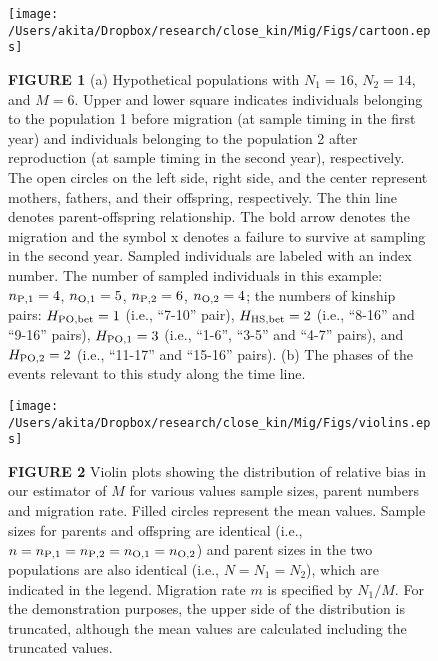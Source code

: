 \documentclass[12pt, English]{article}
\begin{document}
\begin{spacing}{1.9}
\clearpage


\newcommand{\figcapa}{(a) Hypothetical populations with $N_{1}=16$, $N_{2}=14$, and $M=6$. Upper and lower square indicates individuals belonging to the population 1 before migration (at sample timing in the first year) and individuals belonging to the population 2 after reproduction (at sample timing in the second year), respectively. The open circles on the left side, right side, and the center represent mothers, fathers, and their offspring, respectively. The thin line denotes parent-offspring relationship. The bold arrow denotes the migration and the symbol x denotes a failure to survive at sampling in the second year. Sampled individuals are labeled with an index number. The number of sampled individuals in this example: $n_{\rm P, 1}=4$, $n_{\rm O, 1}=5$, $n_{\rm P, 2}=6$, $n_{\rm O, 2}=4$; the numbers of kinship pairs: $H_{\rm PO, bet}=1$ (i.e., ``7-10'' pair), $H_{\rm HS, bet}=2$ (i.e., ``8-16'' and ``9-16'' pairs), $H_{\rm PO, 1}=3$ (i.e., ``1-6'', ``3-5'' and ``4-7'' pairs), and $H_{\rm PO, 2}=2$ (i.e., ``11-17'' and ``15-16'' pairs). (b) The phases of the events relevant to this study along the time line.}

\newcommand{\figcapb}{Violin plots showing the distribution of relative bias in our estimator of $M$ for various values sample sizes, parent numbers and migration rate. Filled circles represent the mean values. Sample sizes for parents and offspring are identical (i.e., $n=n_{\rm P,1}=n_{\rm P,2}=n_{\rm O,1}= n_{\rm O,2}$) and parent sizes in the two populations are also identical (i.e., $N=N_1=N_2$), which are indicated in the legend. Migration rate $m$ is specified by $N_1/M$. For the demonstration purposes, the upper side of the distribution is truncated, although the mean values are calculated including the truncated values. }

\begin{figure}[!h]
	\begin{center}
		\texttt{[image: /Users/akita/Dropbox/research/close\_kin/Mig/Figs/cartoon.eps]}
		\caption{{\bf FIGURE 1} \figcapa{}}
		\label{cartoon}
	\end{center}
\end{figure}

\begin{figure}[!h]
	\begin{center}
		\texttt{[image: /Users/akita/Dropbox/research/close\_kin/Mig/Figs/violins.eps]}
		\caption{{\bf FIGURE 2} \figcapb{}}
		\label{violins}
	\end{center}
\end{figure}




\end{spacing}
\end{document}
